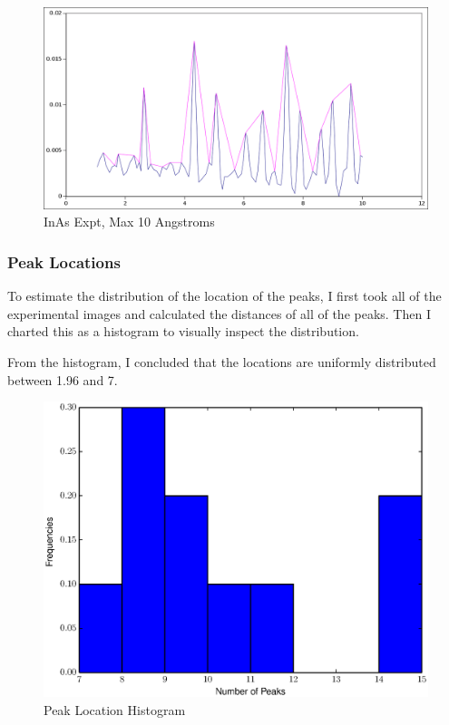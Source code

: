 \documentclass[12pt,letterpaper]{article}
\begin{document}
\begin{figure}[ht]
  \begin{center}
    \includegraphics[scale=0.4]{figs/inas_peaks_10ang.png}
    \caption{InAs Expt, Max 10 Angstroms}
  \end{center}
\end{figure}
\clearpage

\subsubsection{Peak Locations}
To estimate the distribution of the location of the peaks, I first took all of
the experimental images and calculated the distances of all of the peaks. Then I
charted this as a histogram to visually inspect the distribution.

From the histogram, I concluded that the locations are uniformly distributed
between 1.96 and 7.
\begin{figure}[ht]
  \begin{center}
    \includegraphics[scale=0.8]{figs/peak_counts_hist.eps}
    \caption{Peak Location Histogram}
  \end{center}
\end{figure}
\clearpage
\end{document}
